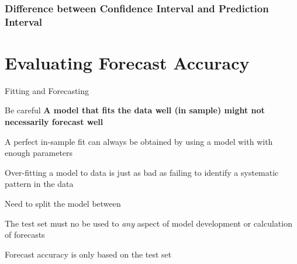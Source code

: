 \documentclass{beamer}
\newenvironment{wideitemize}{\itemize\addtolength{\itemsep}{10pt}}{\enditemize}
\begin{document}
\begin{frame}
  \frametitle{Difference between Confidence Interval and Prediction Interval}
\end{frame}


\section{Evaluating Forecast Accuracy}

\begin{frame}{Fitting and Forecasting}

  \begin{alertblock}{Be careful}
    \textbf{A model that fits the data well (in sample) might not necessarily forecast well}
  \end{alertblock}

  \medskip
  
  \begin{wideitemize}
    \item A perfect in-sample fit can always be obtained by using a model with with enough parameters
    \item Over-fitting a model to data is just as bad as failing to identify a systematic pattern in the data
    \item Need to split the model between 
    \item The test set must no be used to \emph{any} aspect of model development or calculation of forecasts
    \item Forecast accuracy is only based on the test set
  \end{wideitemize}  
\end{frame}
\end{document}
